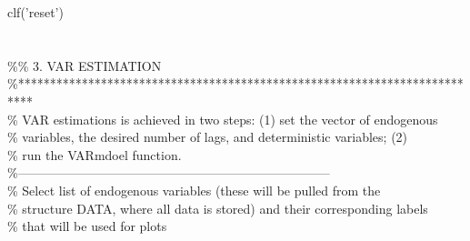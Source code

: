 \hspace{1mm}\hspace{5mm} clf(\textcolor{matlabpurple}{'reset'}) \\ 
\hspace{1mm}\hspace{5mm}  \\ 
\hspace{1mm}\hspace{5mm}  \\ 
\hspace{1mm}\hspace{5mm} \textcolor{matlabgreen}{\%}\textcolor{matlabgreen}{\% 3. VAR ESTIMATION }\\ 
\hspace{1mm}\hspace{5mm} \textcolor{matlabgreen}{\%**************************************************************************  }\\ 
\hspace{1mm}\hspace{5mm} \textcolor{matlabgreen}{\% VAR estimations is achieved in two steps: (1) set the vector of endogenous  }\\ 
\hspace{1mm}\hspace{5mm} \textcolor{matlabgreen}{\% variables, the desired number of lags, and deterministic variables; (2) }\\ 
\hspace{1mm}\hspace{5mm} \textcolor{matlabgreen}{\% run the VARmdoel function. }\\ 
\hspace{1mm}\hspace{5mm} \textcolor{matlabgreen}{\%--------------------------------------------------------------------------  }\\ 
\hspace{1mm}\hspace{5mm} \textcolor{matlabgreen}{\% Select list of endogenous variables (these will be pulled from the  }\\ 
\hspace{1mm}\hspace{5mm} \textcolor{matlabgreen}{\% structure DATA, where all data is stored) and their corresponding labels  }\\ 
\hspace{1mm}\hspace{5mm} \textcolor{matlabgreen}{\% that will be used \textcolor{matlabblue}{for} plots }\\ 
